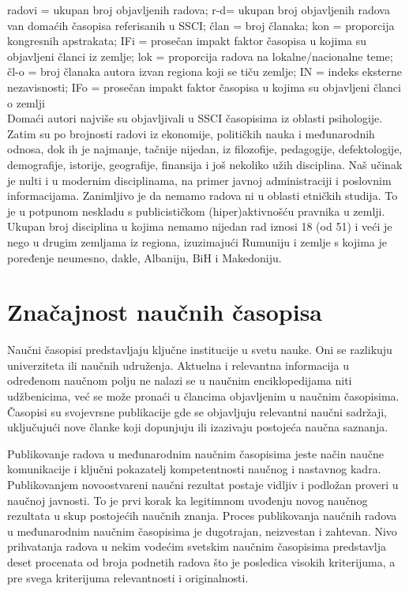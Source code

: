 \documentclass[12pt,a4paper]{article}
\begin{document}
    \qquad

    
    radovi = ukupan broj objavljenih radova; r-d= ukupan broj objavljenih radova van domaćih časopisa referisanih u SSCI; član = broj članaka; kon = proporcija kongresnih apstrakata; IFi = prosečan impakt faktor časopisa u kojima su objavljeni članci iz zemlje; lok = proporcija radova na lokalne/nacionalne teme; čl-o = broj članaka autora izvan regiona koji se tiču zemlje; IN = indeks eksterne nezavisnosti; IFo = prosečan impakt faktor časopisa u kojima su objavljeni članci o zemlji  \cite{7}
    \\
    
    \qquad
      Domaći autori najviše su objavljivali u SSCI časopisima iz oblasti psihologije. Zatim su po brojnosti radovi iz ekonomije, političkih nauka i međunarodnih odnosa, dok ih je najmanje, tačnije nijedan, iz filozofije, pedagogije, defektologije, demografije, istorije, geografije, finansija i još nekoliko užih disciplina. Naš učinak je nulti i u modernim disciplinama, na primer javnoj administraciji i poslovnim informacijama. Zanimljivo je da nemamo radova ni u oblasti etničkih studija. To je u potpunom neskladu s publicističkom (hiper)aktivnošću pravnika u zemlji. Ukupan broj disciplina u kojima nemamo nijedan rad iznosi 18 (od 51) i veći je nego u drugim zemljama iz regiona, izuzimajući Rumuniju i zemlje s kojima je poređenje neumesno, dakle, Albaniju, BiH i Makedoniju. 


    \section{\large\textbf{Značajnost naučnih časopisa}}
    \indent
    
    Naučni časopisi predstavljaju ključne institucije u svetu nauke. Oni se razlikuju univerziteta ili naučnih udruženja. Aktuelna i relevantna informacija u određenom naučnom polju ne nalazi se u naučnim enciklopedijama niti udžbenicima, već se može pronaći u člancima objavljenim u naučnim časopisima.  Časopisi su svojevrsne publikacije gde se objavljuju relevantni naučni sadržaji, uključujući nove članke koji dopunjuju ili izazivaju postojeća naučna saznanja.
   
    Publikovanje radova u međunarodnim naučnim časopisima jeste način naučne komunikacije i ključni pokazatelj kompetentnosti naučnog i nastavnog kadra. Publikovanjem novoostvareni naučni rezultat postaje vidljiv i podložan proveri u naučnoj javnosti. To je prvi korak ka legitimnom uvođenju novog naučnog rezultata u skup postojećih naučnih znanja. Proces publikovanja naučnih radova u međunarodnim naučnim časopisima je dugotrajan, neizvestan i zahtevan. Nivo prihvatanja radova u nekim vodećim svetskim naučnim časopisima predstavlja deset procenata od broja podnetih radova što je posledica visokih kriterijuma, a pre svega kriterijuma relevantnosti i originalnosti. \cite{3} 
    \qquad
\end{document}
